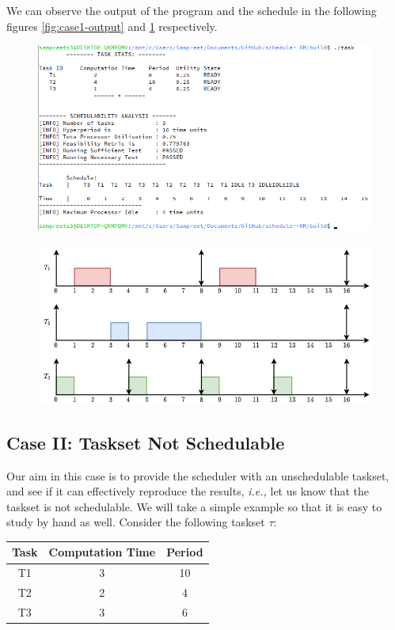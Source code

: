 We can observe the output of the program and the schedule in the following figures \ref{fig:case1-output} and \ref{fig:case1-schedule} respectively.

\begin{figure}[!ht]
\centering
\begin{minipage}{.5\textwidth}
  \centering
  \includegraphics[width=\linewidth]{../imgs/sim-case1-output}
  \label{fig:case1-output}
\end{minipage}%
\begin{minipage}{.5\textwidth}
  \centering
  \includegraphics[width=\linewidth]{../imgs/sim-case1-schedule}
  \label{fig:case1-schedule}
\end{minipage}
\end{figure}

\subsection{Case II: Taskset Not Schedulable}

Our aim in this case is to provide the scheduler with an unschedulable taskset, and see if it can effectively reproduce the results, \textit{i.e.,} let us know that the taskset is not schedulable. We will take a simple example so that it is easy to study by hand as well. Consider the following taskset $\tau$:
\begin{center}
\begin{tabular}{|c|c|c|}
  \hline
  Task & Computation Time & Period \\
  \hline
  T1 & 3 & 10 \\
  \hline
  T2 & 2 & 4 \\
  \hline
  T3 & 3 & 6 \\
  \hline
\end{tabular}
\end{center}


